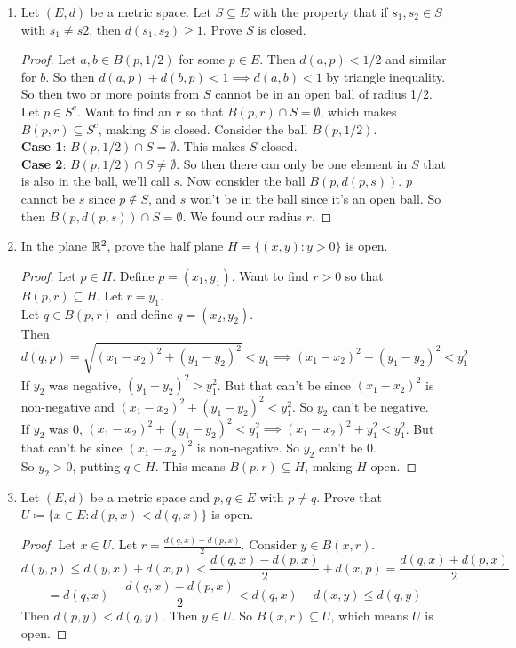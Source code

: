 \documentclass[14pt]{extarticle}
\begin{document}
\begin{enumerate}
		\item Let $(E,d)$ be a metric space. Let $S \subseteq E$ with the property that if $s_1,s_2 \in S$ with $s_1 \neq s2$, then $d(s_1,s_2) \geq 1$. Prove $S$ is closed.
		\begin{proof}
			Let $a,b \in B(p,1/2)$ for some $p \in E$. Then $d(a,p)<1/2$ and similar for $b$. So then $d(a,p) + d(b,p)<1 \implies d(a,b) < 1$ by triangle inequality. So then two or more points from $S$ cannot be in an open ball of radius 1/2.\\
			Let $p \in S^c$. Want to find an $r$ so that $B(p,r) \cap S = \emptyset$, which makes $B(p,r) \subseteq S^c$, making $S$ is closed. Consider the ball $B(p,1/2)$.\\
			\textbf{Case 1}: $B(p,1/2) \cap S = \emptyset$. This makes $S$ closed.\\
			\textbf{Case 2}: $B(p,1/2) \cap S \neq \emptyset$. So then there can only be one element in $S$ that is also in the ball, we'll call $s$. Now consider the ball $B(p,d(p,s))$. $p$ cannot be $s$ since $p\nin S$, and $s$ won't be in the ball since it's an open ball. So then $B(p,d(p,s)) \cap S = \emptyset$. We found our radius $r$.
		\end{proof}
		
		\item In the plane $\mathbb{R}^2$, prove the half plane $H = \{(x,y) : y > 0\}$ is open.
		\begin{proof}
			Let $p \in H$. Define $p = (x_1,y_1)$. Want to find $r>0$ so that $B(p,r) \subseteq H$. Let $r = y_1$.\\
			Let $q \in B(p,r)$ and define $q = (x_2,y_2)$.\\
			Then $$d(q,p) = \sqrt{(x_1-x_2)^2 + (y_1-y_2)^2} < y_1 \implies (x_1-x_2)^2 + (y_1-y_2)^2 < y_1^2$$
			If $y_2$ was negative, $(y_1-y_2)^2 > y_1^2$. But that can't be since $(x_1-x_2)^2$ is non-negative and $(x_1-x_2)^2 + (y_1-y_2)^2 < y_1^2$. So $y_2$ can't be negative.\\
			If $y_2$ was 0, $(x_1-x_2)^2 + (y_1-y_2)^2 < y_1^2 \implies (x_1-x_2)^2 + y_1^2 < y_1^2$. But that can't be since $(x_1-x_2)^2$ is non-negative. So $y_2$ can't be 0.\\
			So $y_2>0$, putting $q \in H$. This means $B(p,r) \subseteq H$, making $H$ open.
		\end{proof}
		
		\item Let $(E,d)$ be a metric space and $p,q \in E$ with $p \neq q$. Prove that $U \coloneq \{x \in E : d(p,x) < d(q,x)\}$ is open.
		\begin{proof}
			Let $x \in U$. Let $r = \frac{d(q,x)-d(p,x)}{2}$. Consider $y \in B(x,r)$.\\
			$$d(y,p) \leq d(y,x) + d(x,p) < \frac{d(q,x)-d(p,x)}{2} + d(x,p) = \frac{d(q,x)+d(p,x)}{2} $$
			$$= d(q,x) - \frac{d(q,x)-d(p,x)}{2} < d(q,x) - d(x,y) \leq d(q,y)$$
			Then $d(p,y) < d(q,y)$. Then $y \in U$. So $B(x,r) \subseteq U$, which means $U$ is open.
		\end{proof}
		

\end{enumerate}
\end{document}
